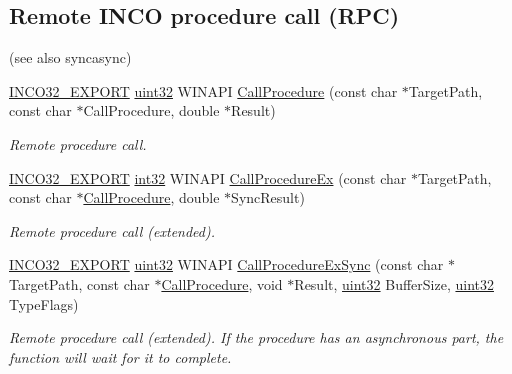 \subsection*{Remote I\+N\+CO procedure call (R\+PC)}
\label{_amgrp66fd2a7eb6c0f71a4c172de68a1997e4}%
(see also syncasync) \begin{DoxyCompactItemize}
\item 
\hyperlink{inco__32_8h_a09505cad5bbb66fc36750a4fbca0444b}{I\+N\+C\+O32\+\_\+\+E\+X\+P\+O\+RT} \hyperlink{indeltypes_8h_a4b435a49c74bb91f284f075e63416cb6}{uint32} W\+I\+N\+A\+PI \hyperlink{group__commonfunctions_gaa2b02d8d33d22482538bd936792904b1}{Call\+Procedure} (const char $\ast$Target\+Path, const char $\ast$Call\+Procedure, double $\ast$Result)
\begin{DoxyCompactList}\small\item\em Remote procedure call. \end{DoxyCompactList}\item 
\hyperlink{inco__32_8h_a09505cad5bbb66fc36750a4fbca0444b}{I\+N\+C\+O32\+\_\+\+E\+X\+P\+O\+RT} \hyperlink{indeltypes_8h_ac44d0188f4f50fd9b03031c1a06bd0a9}{int32} W\+I\+N\+A\+PI \hyperlink{group__commonfunctions_ga6b9c6b3f22614e8a2072f8c490402131}{Call\+Procedure\+Ex} (const char $\ast$Target\+Path, const char $\ast$\hyperlink{group__commonfunctions_gaa2b02d8d33d22482538bd936792904b1}{Call\+Procedure}, double $\ast$Sync\+Result)
\begin{DoxyCompactList}\small\item\em Remote procedure call (extended). \end{DoxyCompactList}\item 
\hyperlink{inco__32_8h_a09505cad5bbb66fc36750a4fbca0444b}{I\+N\+C\+O32\+\_\+\+E\+X\+P\+O\+RT} \hyperlink{indeltypes_8h_a4b435a49c74bb91f284f075e63416cb6}{uint32} W\+I\+N\+A\+PI \hyperlink{group__commonfunctions_ga7ea052077eebe514aa0cb1756c595189}{Call\+Procedure\+Ex\+Sync} (const char $\ast$Target\+Path, const char $\ast$\hyperlink{group__commonfunctions_gaa2b02d8d33d22482538bd936792904b1}{Call\+Procedure}, void $\ast$Result, \hyperlink{indeltypes_8h_a4b435a49c74bb91f284f075e63416cb6}{uint32} Buffer\+Size, \hyperlink{indeltypes_8h_a4b435a49c74bb91f284f075e63416cb6}{uint32} Type\+Flags)
\begin{DoxyCompactList}\small\item\em Remote procedure call (extended). If the procedure has an asynchronous part, the function will wait for it to complete. \end{DoxyCompactList}\item 

\end{DoxyCompactItemize}
